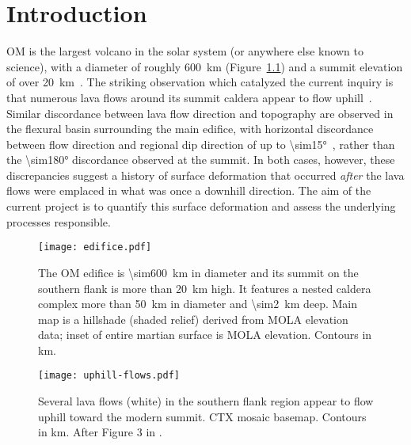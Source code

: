 \chapter{Introduction}
\ac{OM} is the largest volcano in the solar system (or anywhere else known to science), with a diameter of roughly \qty{600}{\km} (Figure~\ref{fig:edifice}) and a summit elevation of over \qty{20}{\km}~\parencite{plescia_morphometric_2004}. The striking observation which catalyzed the current inquiry is that numerous lava flows around its summit caldera appear to flow uphill~\parencite[Figure~\ref{fig:uphill-flows}; after][]{mouginis-mark_late-stage_2019}. Similar discordance between lava flow direction and topography are observed in the flexural basin surrounding the main edifice, with horizontal discordance between flow direction and regional dip direction of up to \ang{\sim15}~\parencite{chadwick_late_2015}, rather than the \ang{\sim180} discordance observed at the summit. In both cases, however, these discrepancies suggest a history of surface deformation that occurred \textit{after} the lava flows were emplaced in what was once a downhill direction. The aim of the current project is to quantify this surface deformation and assess the underlying processes responsible.

\begin{figure}
    \centering
    \texttt{[image: edifice.pdf]}
    \caption[\acl{OM}]{The \ac{OM} edifice is \qty{\sim600}{\km} in diameter and its summit on the southern flank is more than \qty{20}{\km} high. It features a nested caldera complex more than \qty{50}{\km} in diameter and \qty{\sim2}{\km} deep. Main map is a hillshade (shaded relief) derived from \acs{MOLA} elevation data; inset of entire martian surface is \acs{MOLA} elevation. Contours in \unit{\km}.}
    \label{fig:edifice}
\end{figure}

\begin{figure}
    \centering
    \texttt{[image: uphill-flows.pdf]}
    \caption[Uphill lava flows]{Several lava flows (white) in the southern flank region appear to flow uphill toward the modern summit. \acs{CTX} mosaic basemap. Contours in \unit{\km}. After Figure 3 in \textcite{mouginis-mark_late-stage_2019}.}
    \label{fig:uphill-flows}
\end{figure}

